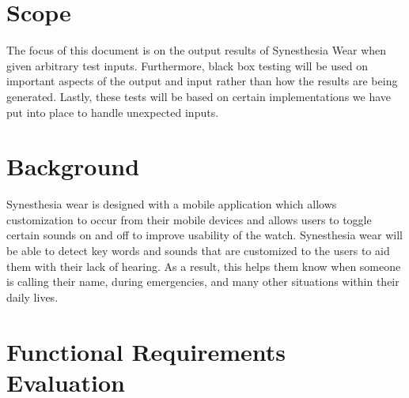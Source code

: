 \documentclass[12pt, titlepage]{article}
\begin{document}
\section{Scope}

The focus of this document is on the output results of Synesthesia Wear when given arbitrary test inputs. Furthermore, black box testing will be used on important aspects of the output and input rather than how the results are being generated. Lastly, these tests will be based on certain implementations we have put into place to handle unexpected inputs.

\section{Background} 

Synesthesia wear is designed with a mobile application which allows customization to occur from their mobile devices and allows users to toggle certain sounds on and off to improve usability of the watch. Synesthesia wear will be able to detect key words and sounds that are customized to the users to aid them with their lack of hearing. As a result, this helps them know when someone is calling their name, during emergencies, and many other situations within their daily lives.


\section{Functional Requirements Evaluation}
\end{document}
